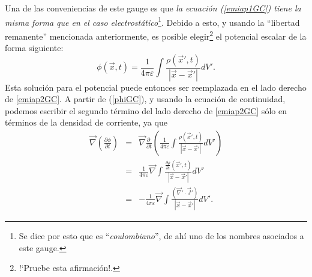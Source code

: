 Una de las conveniencias de este gauge es que \textit{la ecuación (\ref{emiap1GC}) tiene la misma forma que en el caso electrostático}\footnote{Se dice por esto que es ``\textit{coulombiano}'', de ahí uno de los nombres asociados a este gauge.}. Debido a esto, y usando la ``libertad remanente'' mencionada anteriormente, es posible elegir\footnote{!`Pruebe esta afirmación!.} el potencial escalar de la forma siguiente:
\begin{equation}\label{phiGC}
\boxed{ \phi(\vec{x},t)=\frac{1}{4\pi\varepsilon}\int\frac{\rho(\vec{x}',t)}{\left|\vec{x}-\vec{x}'\right|}dV'.}
\end{equation}
Esta solución para el potencial puede entonces ser reemplazada en el lado derecho de \eqref{emiap2GC}. 
A partir de (\ref{phiGC}), y usando la ecuación de continuidad, podemos escribir el segundo término del lado derecho de \eqref{emiap2GC} sólo en términos de la densidad de corriente, ya que
\begin{eqnarray}
\vec{\nabla}\left(\frac{\partial\phi }{\partial t}\right)&=&  \vec{\nabla}\frac{\partial\ }{\partial t}\left(\frac{1}{4\pi\varepsilon}\int\frac{\rho(\vec{x}',t)}{\left|\vec{x}-\vec{x}'\right|}dV'\right) \\
&=&  \frac{1}{4\pi\varepsilon}\vec{\nabla}\int\frac{\frac{\partial\rho }{\partial t}(\vec{x}',t)}{\left|\vec{x}-\vec{x}'\right|}dV' \\
&=& - \frac{1}{4\pi\varepsilon} \vec{\nabla}\int\frac{(\vec{\nabla}'\cdot\vec{J}')}{\left|\vec{x}-\vec{x}'\right|}dV' .%
\end{eqnarray}
